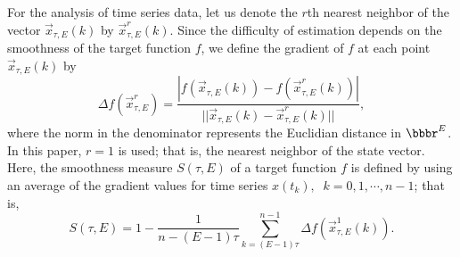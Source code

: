 \documentclass[runningheads,a4paper]{llncs}
\begin{document}
For the analysis of time series data, let us denote the $r$th
nearest neighbor of the vector $\vec{x}_{\tau,E}(k)$ by
$\vec{x}^{r}_{\tau,E}(k)$. Since the difficulty of estimation
depends on the smoothness of the target function $f$, we define the
gradient of $f$ at each point $\vec{x}_{\tau,E}(k)$ by
    \begin{equation} \label{gradient}
        \Delta f(\vec{x}_{\tau, E}^r) =
        \frac{ \left| f(\vec{x}_{\tau,E}(k))
        - f(\vec{x}^{r}_{\tau,E}(k)) \right| }
        {||\vec{x}_{\tau,E}(k) - \vec{x}^{r}_{\tau,E}(k)||},
    \end{equation}
where the norm in the denominator represents the Euclidian distance
in $\bbbr^E$. In this paper, $r=1$ is used; that is, the nearest
neighbor of the state vector.  Here, the smoothness measure
$S(\tau,E)$ of a target function $f$ \cite{Kil99}
is defined by using an
average of the gradient values for time series $x(t_k), \; \; k= 0, 1, \cdots, n-1$; that is,
\begin{equation}
        S(\tau,E) = 1- \frac{1}{n-(E-1)\tau}
        \sum^{n-1}_{k=(E-1)\tau} \Delta f(\vec{x}_{\tau,E}^1(k)).
\label{smooth}
\end{equation}
\end{document}
